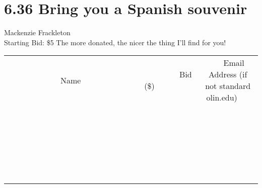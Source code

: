 \documentclass[11pt]{article}
\begin{document}
\section*{6.36 Bring you a Spanish souvenir }
Mackenzie Frackleton
\\
Starting Bid: \$5
\newline
The more donated, the nicer the thing I'll find for you!
\\[6ex]
\begin{tabular}{c c c}
~~~~~~~~~~~~~Name~~~~~~~~~~~~~ & ~~~~~~~~~Bid (\$)~~~~~~~~~  & ~~~Email Address (if not standard olin.edu)~~~\\
 & & \\
\hline
 & & \\
\hline
 & & \\
\hline
 & & \\
\hline
 & & \\
\hline
 & & \\
\hline
 & & \\
\hline
 & & \\
\hline
 & & \\
\hline
 & & \\
\hline
 & & \\
\hline
 & & \\
\hline
 & & \\
\hline
 & & \\
\hline
 & & \\
\hline
 & & \\
\hline
 & & \\
\hline
 & & \\
\hline
 & & \\
\hline
 & & \\
\hline
 & & \\
\hline
 & & \\
\hline
 & & \\
\hline
 & & \\
\hline
 & & \\
\hline
 & & \\
\hline
\end{tabular}
\newpage
\end{document}
